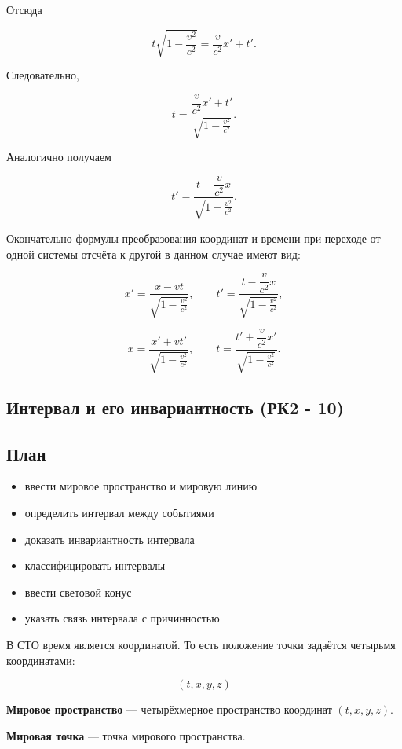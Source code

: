 \documentclass[a4paper,12pt]{article}
\begin{document}
Отсюда

\[
t\sqrt{1 - \frac{v^2}{c^2}}
=
\frac{v}{c^2}x' + t'.
\]

Следовательно,

\[
t =
\frac{\dfrac{v}{c^2}x' + t'}
{\sqrt{1 - \frac{v^2}{c^2}}}.
\]

Аналогично получаем

\[
t' =
\frac{t - \dfrac{v}{c^2}x}
{\sqrt{1 - \frac{v^2}{c^2}}}.
\]

Окончательно формулы преобразования координат и времени при переходе от одной системы отсчёта к другой в данном случае имеют вид:

\[
x' = \frac{x - vt}{\sqrt{1 - \frac{v^2}{c^2}}},
\qquad
t' = \frac{t - \dfrac{v}{c^2}x}{\sqrt{1 - \frac{v^2}{c^2}}},
\]

\[
x = \frac{x' + vt'}{\sqrt{1 - \frac{v^2}{c^2}}},
\qquad
t = \frac{t' + \dfrac{v}{c^2}x'}{\sqrt{1 - \frac{v^2}{c^2}}}.
\]


\subsection{Интервал и его инвариантность (РК2 - 10)}

\subsection*{План}
\begin{itemize}
\item ввести мировое пространство и мировую линию
\item определить интервал между событиями
\item доказать инвариантность интервала
\item классифицировать интервалы
\item ввести световой конус
\item указать связь интервала с причинностью
\end{itemize}

В СТО время является координатой. То есть положение точки задаётся четырьмя координатами:

\[
(t,x,y,z)
\]

\begin{definitionbox}
\textbf{Мировое пространство} — четырёхмерное пространство координат \((t,x,y,z)\).
\end{definitionbox}

\begin{definitionbox}
\textbf{Мировая точка} — точка мирового пространства.
\end{definitionbox}
\end{document}
